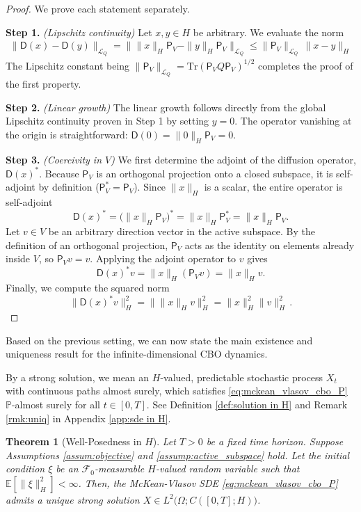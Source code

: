 \documentclass[12pt]{amsart}
\numberwithin{equation}{section}
\newtheorem{theorem}{Theorem}[section]
\begin{document}
\begin{proof} 
We prove each statement separately. 

\textbf{Step 1.} \textit{(Lipschitz continuity)} 
Let $x, y \in H$ be arbitrary. We evaluate the norm
\begin{align*}
    \|\mathsf{D}(x) - \mathsf{D}(y)\|_{\mathscr{L}_Q} = \big\| \|x\|_H \mathsf{P}_V - \|y\|_H \mathsf{P}_V \big\|_{\mathscr{L}_Q}\leq \|\mathsf{P}_V\|_{\mathscr{L}_Q}\, \|x - y\|_H
\end{align*}
The Lipschitz constant being $\|\mathsf{P}_V\|_{\mathscr{L}_Q}= \mathrm{Tr}(\mathsf{P}_V Q \mathsf{P}_V)^{1/2}$ completes the proof of the first property.

\textbf{Step 2.} \textit{(Linear growth)} 
The linear growth follows directly from the global Lipschitz continuity proven in Step 1 by setting $y = 0$. The operator vanishing at the origin is straightforward: $\mathsf{D}(0) = \|0\|_H \mathsf{P}_V =0.$


\textbf{Step 3.} \textit{(Coercivity in $V$)} 
We first determine the adjoint of the diffusion operator, $\mathsf{D}(x)^*$. Because $\mathsf{P}_V$ is an orthogonal projection onto a closed subspace, it is self-adjoint by definition ($\mathsf{P}_V^* = \mathsf{P}_V$). Since $\|x\|_H$ is a scalar, the entire operator is self-adjoint
\[
    \mathsf{D}(x)^* = \big( \|x\|_H \mathsf{P}_V \big)^* = \|x\|_H \mathsf{P}_V^* = \|x\|_H \mathsf{P}_V.
\]
Let $v \in V$ be an arbitrary direction vector in the active subspace. By the definition of an orthogonal projection, $\mathsf{P}_V$ acts as the identity on elements already inside $V$, so $\mathsf{P}_V v = v$. Applying the adjoint operator to $v$ gives
\[
    \mathsf{D}(x)^* v = \|x\|_H (\mathsf{P}_V v) = \|x\|_H v.
\]
Finally, we compute the squared norm
\[
    \|\mathsf{D}(x)^* v\|_H^2 = \big\| \|x\|_H v \big\|_H^2 = \|x\|_H^2 \|v\|_H^2\,.
\]
\end{proof}



Based on the previous setting, we can now state the main existence and uniqueness result for the infinite-dimensional CBO dynamics. 

By a strong solution, we mean an $H$-valued, predictable stochastic process $X_t$ with continuous paths almost surely, which satisfies \eqref{eq:mckean_vlasov_cbo_P} $\mathbb{P}$-almost surely for all $t \in [0,T]$. See Definition \ref{def:solution in H} and Remark \ref{rmk:uniq} in Appendix \ref{app:sde in H}. 

\begin{theorem}[Well-Posedness in $H$]
\label{thm:well_posedness}
Let $T > 0$ be a fixed time horizon. Suppose Assumptions \ref{assum:objective} and \ref{assump:active_subspace} hold. Let the initial condition $\xi$ be an $\mathcal{F}_0$-measurable $H$-valued random variable such that $\mathbb{E}[\|\xi\|_H^2] < \infty$. 
Then, the McKean-Vlasov SDE \eqref{eq:mckean_vlasov_cbo_P} admits a unique strong solution $X \in L^2\big(\Omega; C([0,T]; H)\big)$. 
\end{theorem}
\end{document}
